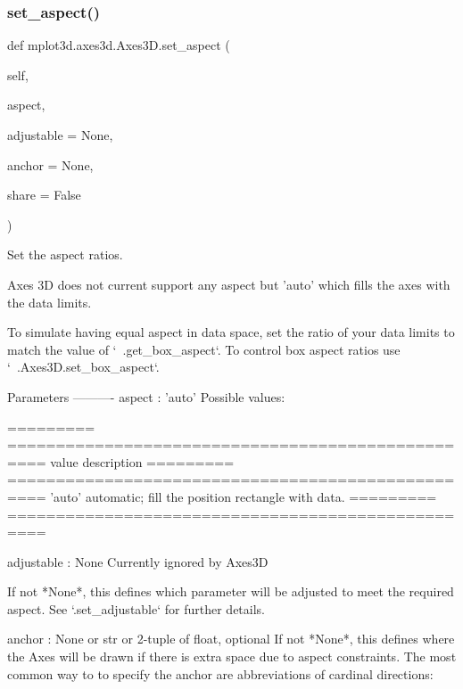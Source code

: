 \begin{DoxyVerb}
\mbox{\label{classmplot3d_1_1axes3d_1_1Axes3D_a8d33058c90a4dee42389a44ef6c3b34a}} 
\subsubsection{\texorpdfstring{set\+\_\+aspect()}{set\_aspect()}}
{\footnotesize\ttfamily def mplot3d.\+axes3d.\+Axes3\+D.\+set\+\_\+aspect (\begin{DoxyParamCaption}\item[{}]{self,  }\item[{}]{aspect,  }\item[{}]{adjustable = {\ttfamily None},  }\item[{}]{anchor = {\ttfamily None},  }\item[{}]{share = {\ttfamily False} }\end{DoxyParamCaption})}

\begin{DoxyVerb}Set the aspect ratios.

Axes 3D does not current support any aspect but 'auto' which fills
the axes with the data limits.

To simulate having equal aspect in data space, set the ratio
of your data limits to match the value of `~.get_box_aspect`.
To control box aspect ratios use `~.Axes3D.set_box_aspect`.

Parameters
----------
aspect : {'auto'}
    Possible values:

    =========   ==================================================
    value       description
    =========   ==================================================
    'auto'      automatic; fill the position rectangle with data.
    =========   ==================================================

adjustable : None
    Currently ignored by Axes3D

    If not *None*, this defines which parameter will be adjusted to
    meet the required aspect. See `.set_adjustable` for further
    details.

anchor : None or str or 2-tuple of float, optional
    If not *None*, this defines where the Axes will be drawn if there
    is extra space due to aspect constraints. The most common way to
    to specify the anchor are abbreviations of cardinal directions:


\end{DoxyVerb}
\end{DoxyVerb}
